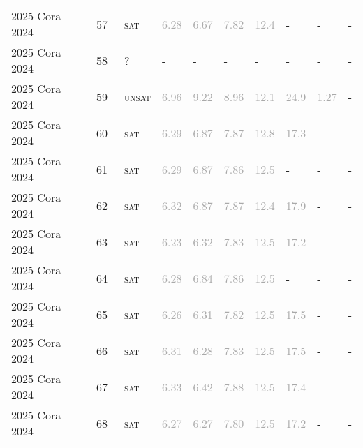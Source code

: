 \begin{center}
{\begin{longtable}{@{}llllllllll@{}}
2025 Cora 2024 & 57 & ~\textsc{sat} & \textcolor{darkgray}{6.28} & \textcolor{darkgray}{6.67} & \textcolor{darkgray}{7.82} & \textcolor{darkgray}{12.4} & - & - & - \\
2025 Cora 2024 & 58 & ~? & - & - & - & - & - & - & - \\
2025 Cora 2024 & 59 & ~\textsc{unsat} & \textcolor{darkgray}{6.96} & \textcolor{darkgray}{9.22} & \textcolor{darkgray}{8.96} & \textcolor{darkgray}{12.1} & \textcolor{darkgray}{24.9} & \textcolor{darkgray}{1.27} & - \\
2025 Cora 2024 & 60 & ~\textsc{sat} & \textcolor{darkgray}{6.29} & \textcolor{darkgray}{6.87} & \textcolor{darkgray}{7.87} & \textcolor{darkgray}{12.8} & \textcolor{darkgray}{17.3} & - & - \\
2025 Cora 2024 & 61 & ~\textsc{sat} & \textcolor{darkgray}{6.29} & \textcolor{darkgray}{6.87} & \textcolor{darkgray}{7.86} & \textcolor{darkgray}{12.5} & - & - & - \\
2025 Cora 2024 & 62 & ~\textsc{sat} & \textcolor{darkgray}{6.32} & \textcolor{darkgray}{6.87} & \textcolor{darkgray}{7.87} & \textcolor{darkgray}{12.4} & \textcolor{darkgray}{17.9} & - & - \\
2025 Cora 2024 & 63 & ~\textsc{sat} & \textcolor{darkgray}{6.23} & \textcolor{darkgray}{6.32} & \textcolor{darkgray}{7.83} & \textcolor{darkgray}{12.5} & \textcolor{darkgray}{17.2} & - & - \\
2025 Cora 2024 & 64 & ~\textsc{sat} & \textcolor{darkgray}{6.28} & \textcolor{darkgray}{6.84} & \textcolor{darkgray}{7.86} & \textcolor{darkgray}{12.5} & - & - & - \\
2025 Cora 2024 & 65 & ~\textsc{sat} & \textcolor{darkgray}{6.26} & \textcolor{darkgray}{6.31} & \textcolor{darkgray}{7.82} & \textcolor{darkgray}{12.5} & \textcolor{darkgray}{17.5} & - & - \\
2025 Cora 2024 & 66 & ~\textsc{sat} & \textcolor{darkgray}{6.31} & \textcolor{darkgray}{6.28} & \textcolor{darkgray}{7.83} & \textcolor{darkgray}{12.5} & \textcolor{darkgray}{17.5} & - & - \\
2025 Cora 2024 & 67 & ~\textsc{sat} & \textcolor{darkgray}{6.33} & \textcolor{darkgray}{6.42} & \textcolor{darkgray}{7.88} & \textcolor{darkgray}{12.5} & \textcolor{darkgray}{17.4} & - & - \\
2025 Cora 2024 & 68 & ~\textsc{sat} & \textcolor{darkgray}{6.27} & \textcolor{darkgray}{6.27} & \textcolor{darkgray}{7.80} & \textcolor{darkgray}{12.5} & \textcolor{darkgray}{17.2} & - & - \\

\end{longtable}}
\end{center}
